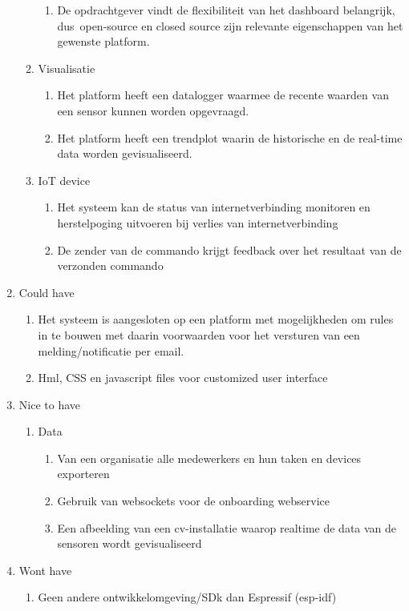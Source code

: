 \begin{enumerate}
\begin{enumerate}
\begin{enumerate}
			\item De opdrachtgever vindt de flexibiliteit van het dashboard belangrijk, dus  open-source en closed source zijn relevante eigenschappen van het gewenste platform.
			
			
		\end{enumerate}
		\item Visualisatie
		\begin{enumerate}
			\item Het platform heeft een datalogger waarmee de recente waarden van een sensor kunnen worden opgevraagd.
			
			\item Het platform heeft een trendplot waarin de historische en de real-time data worden gevisualiseerd.
			
			
			
		\end{enumerate}
		\item IoT device
		\begin{enumerate}
			\item Het systeem kan de status van internetverbinding monitoren en herstelpoging uitvoeren bij verlies van internetverbinding
			
			\item De zender van de commando krijgt feedback over het resultaat van de verzonden commando
			
			
			
		\end{enumerate}
	\end{enumerate}
	\item Could have
	\begin{enumerate}
		\item  Het systeem is aangesloten op een platform met mogelijkheden om rules in te bouwen met daarin voorwaarden voor het versturen van een melding/notificatie per email.
		\item Hml, CSS en javascript files voor customized user interface
		
	\end{enumerate}
	\item Nice to have
	\begin{enumerate}
		\item Data
		\begin{enumerate}
			\item Van een organisatie alle medewerkers en hun taken en devices exporteren
			\item Gebruik van websockets voor de onboarding webservice			
			\item Een afbeelding van een cv-installatie waarop realtime de data van de sensoren wordt gevisualiseerd
		\end{enumerate}
	\end{enumerate}
	\item Wont have
	\begin{enumerate}
		\item Geen andere ontwikkelomgeving/SDk dan Espressif (esp-idf)
		
	\end{enumerate}
\end{enumerate}


